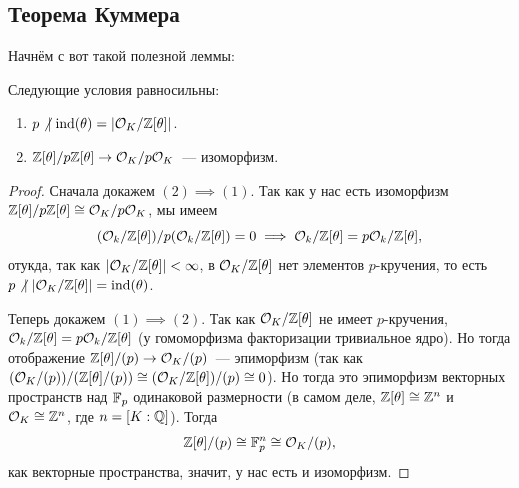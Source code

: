 	\subsection{Теорема Куммера}

	Начнём с вот такой полезной леммы:

	\begin{lemma}\label{ind_and_p}
		Следующие условия равносильны:
		\begin{enumerate}
			\item $p \not\ \mid \operatorname{ind}(\theta) = |\mathcal{O}_{K}/\mathbb{Z}[\theta]|$.
			\item $\mathbb{Z}[\theta]/p\mathbb{Z}[\theta] \to \mathcal{O}_{K}/p\mathcal{O}_{K}$~--- изоморфизм.
		\end{enumerate}
	\end{lemma}

	\begin{proof}
		Сначала докажем $(2) \implies (1)$. Так как у нас есть изоморфизм $\mathbb{Z}[\theta]/p\mathbb{Z}[\theta] \cong \mathcal{O}_{K}/p\mathcal{O}_{K}$, мы имеем 
		\[
			(\mathcal{O}_k/\mathbb{Z}[\theta])/p(\mathcal{O}_k/\mathbb{Z}[\theta]) = 0 \implies \mathcal{O}_k/\mathbb{Z}[\theta] = p\mathcal{O}_k/\mathbb{Z}[\theta],
		\]
		отукда, так как $|\mathcal{O}_K/\mathbb{Z}[\theta]| < \infty$, в $\mathcal{O}_K/\mathbb{Z}[\theta]$ нет элементов $p$-кручения, то есть $p \not \ \mid |\mathcal{O}_K/\mathbb{Z}[\theta]| = \operatorname{ind}(\theta)$. 

		Теперь докажем $(1) \implies (2)$. Так как $\mathcal{O}_K/\mathbb{Z}[\theta]$ не имеет $p$-кручения, $\mathcal{O}_k/\mathbb{Z}[\theta] = p \mathcal{O}_k/\mathbb{Z}[\theta]$ (у гомоморфизма факторизации тривиальное ядро). Но тогда 
		отображение $\mathbb{Z}[\theta]/(p) \to \mathcal{O}_K/(p)$~--- эпиморфизм (так как $(\mathcal{O}_K/(p))/(\mathbb{Z}[\theta]/(p)) \cong (\mathcal{O}_K/\mathbb{Z}[\theta])/(p) \cong 0$). Но тогда это эпиморфизм векторных пространств над $\mathbb{F}_{p}$ одинаковой размерности (в самом деле, $\mathbb{Z}[\theta] \cong \mathbb{Z}^{n}$ и $\mathcal{O}_K \cong \mathbb{Z}^n$, где $n = [K : \mathbb{Q}]$). Тогда 
		\[
			\mathbb{Z}[\theta]/(p) \cong \mathbb{F}_{p}^{n} \cong \mathcal{O}_{K}/(p),
		\]
		как векторные пространства, значит, у нас есть и изоморфизм. 
	\end{proof}

